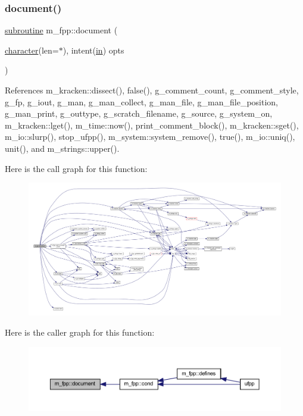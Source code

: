 \subsubsection{\texorpdfstring{document()}{document()}}
{\footnotesize\ttfamily \hyperlink{M__stopwatch_83_8txt_acfbcff50169d691ff02d4a123ed70482}{subroutine} m\+\_\+fpp\+::document (\begin{DoxyParamCaption}\item[{\hyperlink{option__stopwatch_83_8txt_abd4b21fbbd175834027b5224bfe97e66}{character}(len=$\ast$), intent(\hyperlink{M__journal_83_8txt_afce72651d1eed785a2132bee863b2f38}{in})}]{opts }\end{DoxyParamCaption})}



References m\+\_\+kracken\+::dissect(), false(), g\+\_\+comment\+\_\+count, g\+\_\+comment\+\_\+style, g\+\_\+fp, g\+\_\+iout, g\+\_\+man, g\+\_\+man\+\_\+collect, g\+\_\+man\+\_\+file, g\+\_\+man\+\_\+file\+\_\+position, g\+\_\+man\+\_\+print, g\+\_\+outtype, g\+\_\+scratch\+\_\+filename, g\+\_\+source, g\+\_\+system\+\_\+on, m\+\_\+kracken\+::lget(), m\+\_\+time\+::now(), print\+\_\+comment\+\_\+block(), m\+\_\+kracken\+::sget(), m\+\_\+io\+::slurp(), stop\+\_\+ufpp(), m\+\_\+system\+::system\+\_\+remove(), true(), m\+\_\+io\+::uniq(), unit(), and m\+\_\+strings\+::upper().

Here is the call graph for this function\+:
\nopagebreak
\begin{figure}[H]
\begin{center}
\leavevmode
\includegraphics[width=350pt]{namespacem__fpp_a36ad74639f1f01dd0ac08e59e6943778_cgraph}
\end{center}
\end{figure}
Here is the caller graph for this function\+:
\nopagebreak
\begin{figure}[H]
\begin{center}
\leavevmode
\includegraphics[width=350pt]{namespacem__fpp_a36ad74639f1f01dd0ac08e59e6943778_icgraph}
\end{center}
\end{figure}
\mbox{\label{namespacem__fpp_acf16ae34a4c7e769114656c3dbbe0640}} 
